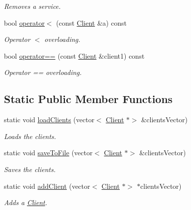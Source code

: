 \begin{DoxyCompactItemize}
\begin{DoxyCompactList}\small\item\em Removes a service. \end{DoxyCompactList}\item 
bool \hyperlink{class_client_a1cbbbf2ea0d65791314b7640c053197b}{operator$<$} (const \hyperlink{class_client}{Client} \&a) const
\begin{DoxyCompactList}\small\item\em Operator $<$ overloading. \end{DoxyCompactList}\item 
bool \hyperlink{class_client_a5cc669077f776648216ae03461b8c178}{operator==} (const \hyperlink{class_client}{Client} \&client1) const
\begin{DoxyCompactList}\small\item\em Operator == overloading. \end{DoxyCompactList}\end{DoxyCompactItemize}
\subsection*{Static Public Member Functions}
\begin{DoxyCompactItemize}
\item 
static void \hyperlink{class_client_ac18a40ed6975665b7f7661c8dcf7bf1b}{load\+Clients} (vector$<$ \hyperlink{class_client}{Client} $\ast$$>$ \&clients\+Vector)
\begin{DoxyCompactList}\small\item\em Loads the clients. \end{DoxyCompactList}\item 
static void \hyperlink{class_client_aceebaabb74ad1e3e5b30c168e5ef681b}{save\+To\+File} (vector$<$ \hyperlink{class_client}{Client} $\ast$$>$ \&clients\+Vector)
\begin{DoxyCompactList}\small\item\em Saves the clients. \end{DoxyCompactList}\item 
static void \hyperlink{class_client_acd07078857cade36eee66b733de7bc38}{add\+Client} (vector$<$ \hyperlink{class_client}{Client} $\ast$$>$ $\ast$clients\+Vector)
\begin{DoxyCompactList}\small\item\em Adds a \hyperlink{class_client}{Client}. \end{DoxyCompactList}\end{DoxyCompactItemize}
